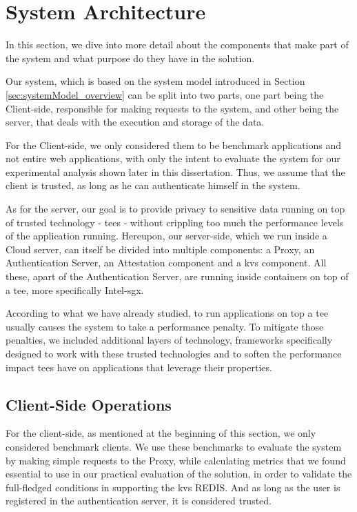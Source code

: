 \section{System Architecture}
\label{sec:systemArchitecture}
In this section, we dive into more detail about the components that make part of the system and what purpose do they have in the solution.  

Our system, which is based on the system model introduced in Section \ref{sec:systemModel_overview} can be split into two parts, one part being the Client-side, responsible for making requests to the system, and other being the server, that deals with the execution and storage of the data.

For the Client-side, we only considered them to be benchmark applications and not entire web applications, with only the intent to evaluate the system for our experimental analysis shown later in this dissertation. Thus, we assume that the client is trusted, as long as he can authenticate himself in the system.

As for the server, our goal is to provide privacy to sensitive data running on top of trusted technology - \gls{tee}s - without crippling too much the performance levels of the application running. 
Hereupon, our server-side, which we run inside a Cloud server, can itself be divided into multiple components: a Proxy, an Authentication Server, an Attestation component and a \gls{kvs} component. All these, apart of the Authentication Server, are running inside containers on top of a \gls{tee}, more specifically Intel-\gls{sgx}.

According to what we have already studied, to run applications on top a \gls{tee} usually causes the system to take a performance penalty. To mitigate those penalties, we included additional layers of technology, frameworks specifically designed to work with these trusted technologies and to soften the performance impact \gls{tee}s have on applications that leverage their properties. 

\subsection{Client-Side Operations}

For the client-side, as mentioned at the beginning of this section, we only considered benchmark clients. We use these benchmarks to evaluate the system by making simple requests to the Proxy, while calculating metrics that we found essential to use in our practical evaluation of the solution, in order to validate the full-fledged conditions in supporting the \gls{kvs} REDIS. And as long as the user is registered in the authentication server, it is considered trusted.


